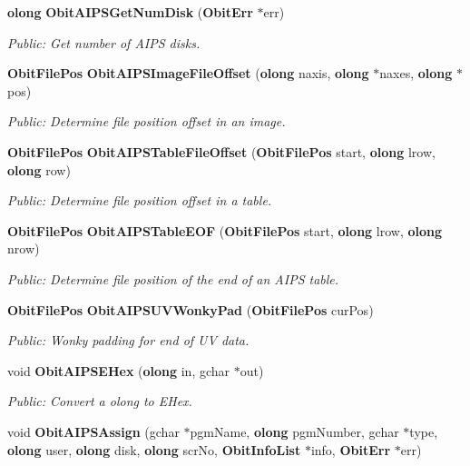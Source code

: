 \begin{CompactItemize}
{\bf olong} {\bf Obit\-AIPSGet\-Num\-Disk} ({\bf Obit\-Err} $\ast$err)
\begin{CompactList}\small\item\em Public: Get number of AIPS disks. \item\end{CompactList}\item 
{\bf Obit\-File\-Pos} {\bf Obit\-AIPSImage\-File\-Offset} ({\bf olong} naxis, {\bf olong} $\ast$naxes, {\bf olong} $\ast$pos)
\begin{CompactList}\small\item\em Public: Determine file position offset in an image. \item\end{CompactList}\item 
{\bf Obit\-File\-Pos} {\bf Obit\-AIPSTable\-File\-Offset} ({\bf Obit\-File\-Pos} start, {\bf olong} lrow, {\bf olong} row)
\begin{CompactList}\small\item\em Public: Determine file position offset in a table. \item\end{CompactList}\item 
{\bf Obit\-File\-Pos} {\bf Obit\-AIPSTable\-EOF} ({\bf Obit\-File\-Pos} start, {\bf olong} lrow, {\bf olong} nrow)
\begin{CompactList}\small\item\em Public: Determine file position of the end of an AIPS table. \item\end{CompactList}\item 
{\bf Obit\-File\-Pos} {\bf Obit\-AIPSUVWonky\-Pad} ({\bf Obit\-File\-Pos} cur\-Pos)
\begin{CompactList}\small\item\em Public: Wonky padding for end of UV data. \item\end{CompactList}\item 
void {\bf Obit\-AIPSEHex} ({\bf olong} in, gchar $\ast$out)
\begin{CompactList}\small\item\em Public: Convert a olong to EHex. \item\end{CompactList}\item 
void {\bf Obit\-AIPSAssign} (gchar $\ast$pgm\-Name, {\bf olong} pgm\-Number, gchar $\ast$type, {\bf olong} user, {\bf olong} disk, {\bf olong} scr\-No, {\bf Obit\-Info\-List} $\ast$info, {\bf Obit\-Err} $\ast$err)

\end{CompactItemize}

